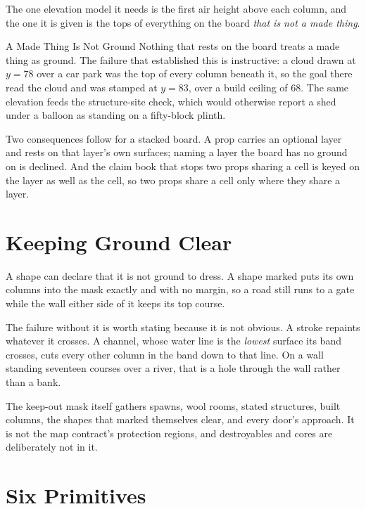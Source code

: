 The one elevation model it needs is the first air height above each column, and the
one it is given is the tops of everything on the board \emph{that is not a made
thing}.

\begin{ruling}{A Made Thing Is Not Ground}
Nothing that rests on the board treats a made thing as ground. The failure that
established this is instructive: a cloud drawn at $y=78$ over a car park was the
top of every column beneath it, so the goal there read the cloud and was stamped at
$y=83$, over a build ceiling of 68. The same elevation feeds the structure-site
check, which would otherwise report a shed under a balloon as standing on a
fifty-block plinth.
\end{ruling}

Two consequences follow for a stacked board. A prop carries an optional layer and
rests on that layer's own surfaces; naming a layer the board has no ground on is
declined. And the claim book that stops two props sharing a cell is keyed on the
layer as well as the cell, so two props share a cell only where they share a layer.

\section{Keeping Ground Clear}

A shape can declare that it is not ground to dress. A shape marked 
puts its own columns into the mask exactly and with no margin, so a road still runs
to a gate while the wall either side of it keeps its top course.

The failure without it is worth stating because it is not obvious. A stroke
repaints whatever it crosses. A channel, whose water line is the \emph{lowest}
surface its band crosses, cuts every other column in the band down to that line.
On a wall standing seventeen courses over a river, that is a hole through the wall
rather than a bank.

The keep-out mask itself gathers spawns, wool rooms, stated structures, built
columns, the shapes that marked themselves clear, and every door's approach. It is
not the map contract's protection regions, and destroyables and cores are
deliberately not in it.

\section{Six Primitives}

